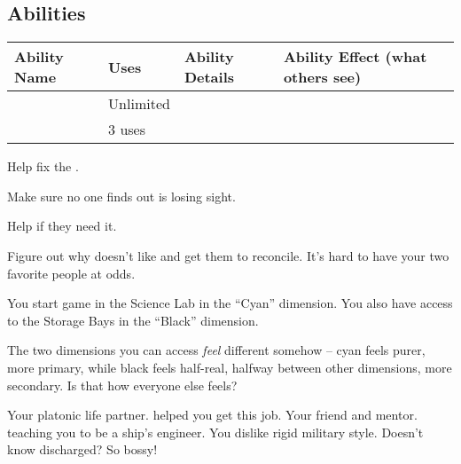 \documentclass[char]{TMFHope}
\begin{document}
\subsection*{Abilities}
\begin{tabular}{|p{2cm}|p{1.5cm}|p{9cm}|p{3.5cm}|} 
 \hline
 \textbf{Ability Name} & \textbf{Uses} & \textbf{Ability Details} & \textbf{Ability Effect (what others see)} \\ 
\hline 
 \aEngineering{\MYname} & Unlimited & \aEngineering{\MYtext} & \aEngineering{\MYeffect} \\ 
\hline
 \aNegotiation{\MYname} & 3 uses & \aNegotiation{\MYtext} & \aNegotiation{\MYeffect}\\ 
 \hline
\end{tabular}

\begin{itemz}[Goals]
	\item Help \cEng{} fix the \pNew{}.
	\item Make sure no one finds out \cEng{} is losing \cEng{\their} sight.
	\item Help \cNav{} if they need it.
	\item Figure out why \cEng{} doesn't like \cNav{} and get them to reconcile. It's hard to have your two favorite people at odds.
\end{itemz}

\begin{itemz}[Notes]
	\item You start game in the Science Lab in the ``Cyan'' dimension. You also have access to the Storage Bays in the ``Black'' dimension.
	\item The two dimensions you can access {\em feel} different somehow -- cyan feels purer, more primary, while black feels half-real, halfway between other dimensions, more secondary.  Is that how everyone else feels?
\end{itemz}

\begin{contacts}
	\contact{\cNav{}} Your platonic life partner. \cNav{\They} helped you get this job.
	\contact{\cEng{}} Your friend and mentor. \cEng{\They} \cEng{\are} teaching you to be a ship's engineer.
	\contact{\cCap{}} You dislike \cCap{\their} rigid military style. Doesn't \cCap{} know \cCap{\they} \cCap{\were} discharged? So bossy!
\end{contacts}
\end{document}
